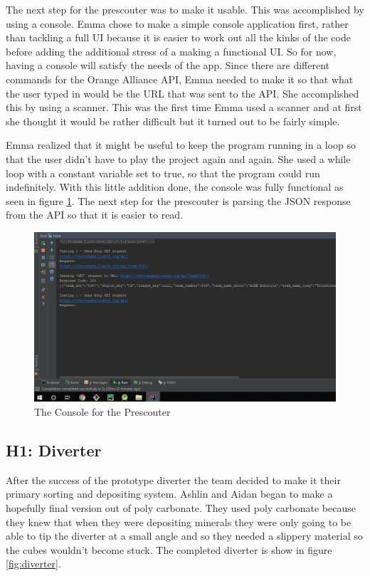 \documentclass{article}
\begin{document}
The next step for the prescouter was to make it usable. This was accomplished by using a console. Emma chose to make a simple console application first, rather than tackling a full UI because it is easier to work out all the kinks of the code before adding the additional stress of a making a functional UI. So for now, having a console will satisfy the needs of the app. Since there are different commands for the Orange Alliance API, Emma needed to make it so that what the user typed in would be the URL that was sent to the API. She accomplished this by using a scanner. This was the first time Emma used a scanner and at first she thought it would be rather difficult but it turned out to be fairly simple. 

Emma realized that it might be useful to keep the program running in a loop so that the user didn't have to play the project again and again. She used a while loop with a constant variable set to true, so that the program could run indefinitely. With this little addition done, the console was fully functional as seen in figure \ref{fig:console}. The next step for the prescouter is parsing the JSON response from the API so that it is easier to read. 

\begin{figure}
    \centering
    \includegraphics[width=.6 \textwidth]{15_12-10/images/console.png}
    \caption{The Console for the Prescouter}
    \label{fig:console}
\end{figure}
\subsection{H1: Diverter}

After the success of the prototype diverter the team decided to make it their primary sorting and depositing system. Ashlin and Aidan began to make a hopefully final version out of poly carbonate. They used poly carbonate because they knew that when they were depositing minerals they were only going to be able to tip the diverter at a small angle and so they needed a slippery material so the cubes wouldn't become stuck. The completed diverter is show in figure  \ref{fig:diverter}.
\end{document}
